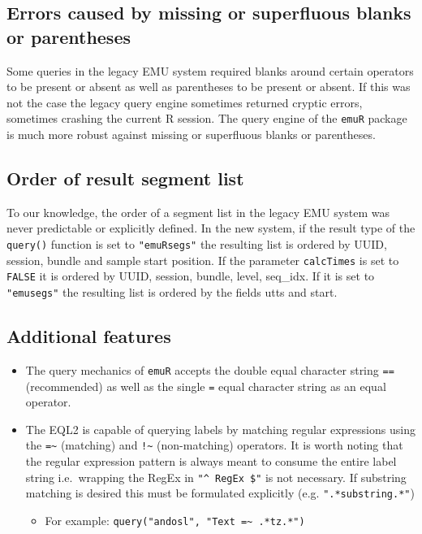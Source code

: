\documentclass[]{book}
\providecommand{\tightlist}{%
  \setlength{\itemsep}{0pt}\setlength{\parskip}{0pt}}
\begin{document}
\hypertarget{errors-caused-by-missing-or-superfluous-blanks-or-parentheses}{%
\subsection{Errors caused by missing or superfluous blanks or parentheses}\label{errors-caused-by-missing-or-superfluous-blanks-or-parentheses}}

Some queries in the legacy EMU system required blanks around certain operators to be present or absent as well as parentheses to be present or absent. If this was not the case the legacy query engine sometimes returned cryptic errors, sometimes crashing the current R session. The query engine of the \texttt{emuR} package is much more robust against missing or superfluous blanks or parentheses.

\hypertarget{order-of-result-segment-list}{%
\subsection{Order of result segment list}\label{order-of-result-segment-list}}

To our knowledge, the order of a segment list in the legacy EMU system was never predictable or explicitly defined. In the new system, if the result type of the \texttt{query()} function is set to \texttt{"emuRsegs"} the resulting list is ordered by UUID, session, bundle and sample start position. If the parameter \texttt{calcTimes} is set to \texttt{FALSE} it is ordered by UUID, session, bundle, level, seq\_idx. If it is set to \texttt{"emusegs"} the resulting list is ordered by the fields utts and start.

\hypertarget{additional-features}{%
\subsection{Additional features}\label{additional-features}}

\begin{itemize}
\tightlist
\item
  The query mechanics of \texttt{emuR} accepts the double equal character string \texttt{==} (recommended) as well as the single \texttt{=} equal character string as an equal operator.
\item
  The EQL2 is capable of querying labels by matching regular expressions using the \texttt{=\textasciitilde{}} (matching) and \texttt{!\textasciitilde{}} (non-matching) operators. It is worth noting that the regular expression pattern is always meant to consume the entire label string i.e.~wrapping the RegEx in \texttt{"\^{}\ RegEx\ \$"} is not necessary. If substring matching is desired this must be formulated explicitly (e.g. \texttt{".*substring.*"})

  \begin{itemize}
  \tightlist
  \item
    For example: \texttt{query("andosl",\ "Text\ =\textasciitilde{}\ .*tz.*")}
  \end{itemize}
\end{itemize}
\end{document}
